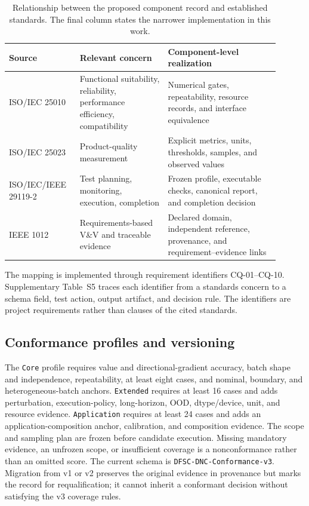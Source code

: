 \documentclass[preprint,12pt,authoryear]{elsarticle}
\begin{document}
\begin{table}[t]
\centering
\small
\setlength{\tabcolsep}{4pt}
\caption{Relationship between the proposed component record and established standards. The final column states the narrower implementation in this work.}
\label{tab:standards-map}
\begin{tabular}{>{\raggedright\arraybackslash}p{0.22\linewidth}>{\raggedright\arraybackslash}p{0.30\linewidth}>{\raggedright\arraybackslash}p{0.38\linewidth}}
\toprule
Source & Relevant concern & Component-level realization\\
\midrule
ISO/IEC 25010 & Functional suitability, reliability, performance efficiency, compatibility & Numerical gates, repeatability, resource records, and interface equivalence\\
ISO/IEC 25023 & Product-quality measurement & Explicit metrics, units, thresholds, samples, and observed values\\
ISO/IEC/IEEE 29119-2 & Test planning, monitoring, execution, completion & Frozen profile, executable checks, canonical report, and completion decision\\
IEEE 1012 & Requirements-based V\&V and traceable evidence & Declared domain, independent reference, provenance, and requirement--evidence links\\
\bottomrule
\end{tabular}
\end{table}

The mapping is implemented through requirement identifiers CQ-01--CQ-10. Supplementary Table~S5 traces each identifier from a standards concern to a schema field, test action, output artifact, and decision rule. The identifiers are project requirements rather than clauses of the cited standards.

\subsection{Conformance profiles and versioning}
The \texttt{Core} profile requires value and directional-gradient accuracy, batch shape and independence, repeatability, at least eight cases, and nominal, boundary, and heterogeneous-batch anchors. \texttt{Extended} requires at least 16 cases and adds perturbation, execution-policy, long-horizon, OOD, dtype/device, unit, and resource evidence. \texttt{Application} requires at least 24 cases and adds an application-composition anchor, calibration, and composition evidence. The scope and sampling plan are frozen before candidate execution. Missing mandatory evidence, an unfrozen scope, or insufficient coverage is a nonconformance rather than an omitted score. The current schema is \texttt{DFSC-DNC-Conformance-v3}. Migration from v1 or v2 preserves the original evidence in provenance but marks the record for requalification; it cannot inherit a conformant decision without satisfying the v3 coverage rules.
\end{document}
